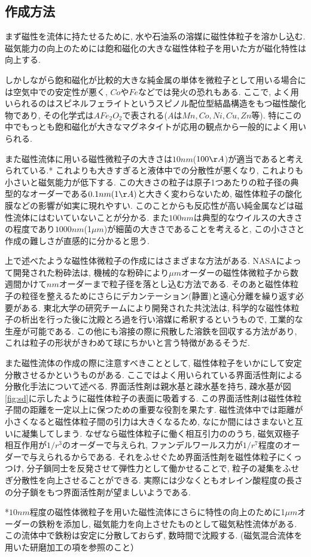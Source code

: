 \documentclass[b5,twocolumn,11pt]{jarticle}
\begin{document}
  \subsection{作成方法}
まず磁性を流体に持たせるために, 水や石油系の溶媒に磁性体粒子を溶かし込む. 磁気能力の向上のためには飽和磁化の大きな磁性体粒子を用いた方が磁化特性は向上する. \par
しかしながら飽和磁化が比較的大きな純金属の単体を微粒子として用いる場合には空気中での安定性が悪く, $Co$や$Fe$などでは発火の恐れもある. ここで, よく用いられるのはスピネルフェライトというスピノル配位型結晶構造をもつ磁性酸化物であり, その化学式は$AFe_2O_2$で表される\cite{No7_磁気工学の基礎}($A$は$Mn,Co,Ni,Cu,Zn$等). 特にこの中でもっとも飽和磁化が大きなマグネタイトが応用の観点から一般的によく用いられる. \par
また磁性流体に用いる磁性微粒子の大きさは$10nm$($100\AA$)が適当であると考えられている.* これよりも大きすぎると液体中での分散性が悪くなり, これよりも小さいと磁気能力が低下する. この大きさの粒子は原子1つあたりの粒子径の典型的なオーダーである$0.1nm(1\AA)$と大きく変わらないため, 磁性体粒子の酸化膜などの影響が如実に現れやすい. このことからも反応性が高い純金属などは磁性流体にはむいていないことが分かる. また$100nm$は典型的なウイルスの大きさの程度であり$1000nm$(1$\mu m$)が細菌の大きさであることを考えると, この小ささと作成の難しさが直感的に分かると思う. \par
上で述べたような磁性体微粒子の作成にはさまざまな方法がある. NASAによって開発された粉砕法は, 機械的な粉砕により$\mu m$オーダーの磁性体微粒子から数週間かけて$nm$オーダーまで粒子径を落とし込む方法である. そのあと磁性体粒子の粒径を整えるためにさらにデカンテーション(静置)と遠心分離を繰り返す必要がある. 東北大学の研究チームにより開発された共沈法は, 科学的な磁性体粒子の析出を行った後に沈殿とろ過を行い溶媒に希釈するというもので, 工業的な生産が可能である. この他にも溶接の際に飛散した溶鉄を回収する方法があり, これは粒子の形状がきわめて球にちかいと言う特徴があるそうだ. \par
また磁性流体の作成の際に注意すべきこととして, 磁性体粒子をいかにして安定分散させるかというものがある. ここではよく用いられている界面活性剤による分散化手法について述べる. 界面活性剤は親水基と疎水基を持ち, 疎水基が図\ref{fig:sd}に示したように磁性体粒子の表面に吸着する. この界面活性剤は磁性体粒子間の距離を一定以上に保つための重要な役割を果たす. 磁性流体中では距離が小さくなると磁性体粒子間の引力は大きくなるため, なにか間にはさまないと互いに凝集してしまう. なぜなら磁性体粒子に働く相互引力ののうち, 磁気双極子相互作用が$1/r^3$のオーダーで与えられ, ファンデルワールス力が$1/r^7$程度のオーダーで与えられるからである. それをふせぐため界面活性剤を磁性体粒子にくっつけ, 分子鎖同士を反発させて弾性力として働かせることで, 粒子の凝集をふせぎ分散性を向上させることができる. 実際には少なくともオレイン酸程度の長さの分子鎖をもつ界面活性剤が望ましいようである. \par
*$10nm$程度の磁性体微粒子を用いた磁性流体にさらに特性の向上のために1$\mu m$オーダーの鉄粉を添加し, 磁気能力を向上させたものとして磁気粘性流体がある. この流体中で鉄粉は安定に分散しておらず, 数時間で沈殿する. (磁気混合流体を用いた研磨加工の項を参照のこと）
\end{document}

